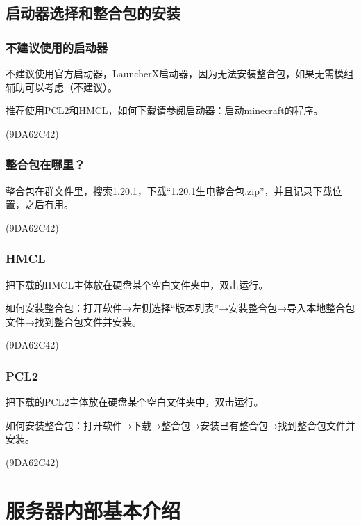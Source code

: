 \documentclass[UTF8,a4paper]{article}
\begin{document}
		\subsection{启动器选择和整合包的安装}
			\hypertarget{qidongqixuanze}{}
			\subsubsection{不建议使用的启动器}
				\par 不建议使用官方启动器，LauncherX启动器，因为无法安装整合包，如果无需模组辅助可以考虑（不建议）。
				\par 推荐使用PCL2和HMCL，如何下载请参阅\hyperlink{qidongqi}{启动器：启动minecraft的程序}。
				\begin{flushright}(9DA62C42)\end{flushright}
			\subsubsection{整合包在哪里？}
				\par 整合包在群文件里，搜索1.20.1，下载“1.20.1生电整合包.zip”，并且记录下载位置，之后有用。
				\begin{flushright}(9DA62C42)\end{flushright}
			\subsubsection{HMCL}
				\par 把下载的HMCL主体放在硬盘某个空白文件夹中，双击运行。
				\par 如何安装整合包：打开软件→左侧选择“版本列表”→安装整合包→导入本地整合包文件→找到整合包文件并安装。
				\begin{flushright}(9DA62C42)\end{flushright}
			\subsubsection{PCL2}
				\par 把下载的PCL2主体放在硬盘某个空白文件夹中，双击运行。
				\par 如何安装整合包：打开软件→下载→整合包→安装已有整合包→找到整合包文件并安装。
				\begin{flushright}(9DA62C42)\end{flushright}

	\section{服务器内部基本介绍}
\end{document}
